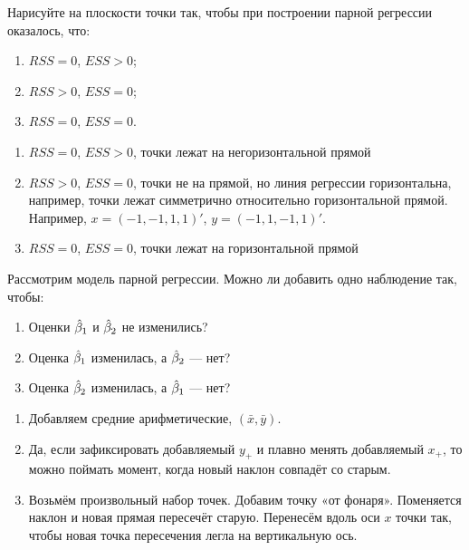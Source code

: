 \begin{problem}
Нарисуйте на плоскости точки так, чтобы при построении парной регрессии оказалось, что:
\begin{enumerate}
\item $RSS=0$, $ESS>0$;
\item $RSS>0$, $ESS=0$;
\item $RSS=0$, $ESS=0$.
\end{enumerate}



\begin{sol}
\begin{enumerate}
\item $RSS=0$, $ESS>0$, точки лежат на негоризонтальной прямой
\item $RSS>0$, $ESS=0$, точки не на прямой, но линия регрессии горизонтальна, например, точки лежат симметрично относительно горизонтальной прямой. Например, \(x = (-1, -1, 1, 1)'\), \(y = (-1, 1, -1, 1)'\).
\item $RSS=0$, $ESS=0$, точки лежат на горизонтальной прямой
\end{enumerate}

\end{sol}
\end{problem}



\begin{problem}
Рассмотрим модель парной регрессии. Можно ли добавить одно наблюдение так, чтобы:
\begin{enumerate}
\item Оценки $\hat{\beta}_1$ и $\hat{\beta}_2$ не изменились?
\item Оценка $\hat{\beta}_1$ изменилась, а $\hat{\beta}_2$ — нет?
\item Оценка $\hat{\beta}_2$ изменилась, а $\hat{\beta}_1$ — нет?
\end{enumerate}

\begin{sol}
  \begin{enumerate}
  \item Добавляем средние арифметические, $(\bar x, \bar y)$.
  \item Да, если зафиксировать добавляемый $y_{+}$ и плавно менять добавляемый $x_{+}$, то можно поймать момент, когда новый наклон совпадёт со старым.
  \item Возьмём произвольный набор точек. Добавим точку «от фонаря». Поменяется наклон и новая прямая пересечёт старую. Перенесём вдоль оси $x$ точки так, чтобы новая точка пересечения легла на вертикальную ось.
  \end{enumerate}
\end{sol}
\end{problem}


